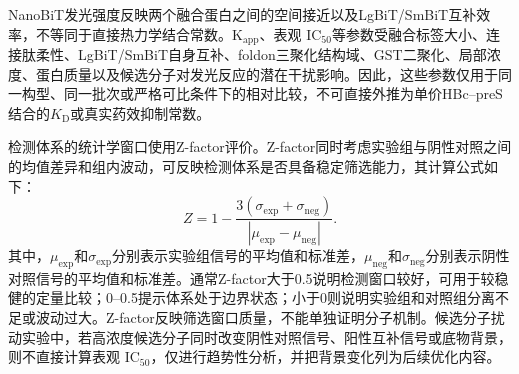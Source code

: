 NanoBiT发光强度反映两个融合蛋白之间的空间接近以及LgBiT/SmBiT互补效率，不等同于直接热力学结合常数。K$_{\mathrm{app}}$、表观 IC$_{50}$等参数受融合标签大小、连接肽柔性、LgBiT/SmBiT自身互补、foldon三聚化结构域、GST二聚化、局部浓度、蛋白质量以及候选分子对发光反应的潜在干扰影响。因此，这些参数仅用于同一构型、同一批次或严格可比条件下的相对比较，不可直接外推为单价HBc--preS结合的$K_{\mathrm{D}}$或真实药效抑制常数。

检测体系的统计学窗口使用Z-factor评价。Z-factor同时考虑实验组与阴性对照之间的均值差异和组内波动，可反映检测体系是否具备稳定筛选能力，其计算公式如下\cite{zhang1999simple}：
\begin{equation}
  Z = 1 - \frac{3\left(\sigma_{\mathrm{exp}}+\sigma_{\mathrm{neg}}\right)}
  {\left|\mu_{\mathrm{exp}}-\mu_{\mathrm{neg}}\right|}.
  \label{eq:z-factor}
\end{equation}
其中，$\mu_{\mathrm{exp}}$和$\sigma_{\mathrm{exp}}$分别表示实验组信号的平均值和标准差，$\mu_{\mathrm{neg}}$和$\sigma_{\mathrm{neg}}$分别表示阴性对照信号的平均值和标准差。通常Z-factor大于0.5说明检测窗口较好，可用于较稳健的定量比较；0--0.5提示体系处于边界状态；小于0则说明实验组和对照组分离不足或波动过大。Z-factor反映筛选窗口质量，不能单独证明分子机制。候选分子扰动实验中，若高浓度候选分子同时改变阴性对照信号、阳性互补信号或底物背景，则不直接计算表观 IC$_{50}$，仅进行趋势性分析，并把背景变化列为后续优化内容。
